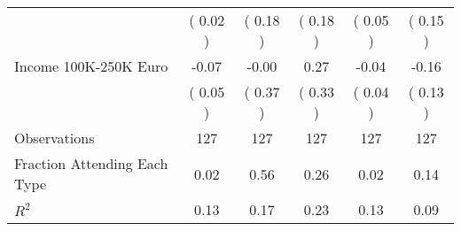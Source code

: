 \begin{table}[H]
{\begin{tabular}{lccccc}
\quad  & (     0.02 ) & (     0.18 )  & (     0.18 )  & (     0.05 ) & (     0.15 ) \\
\quad Income 100K-250K Euro &     -0.07 &     -0.00 &      0.27 &     -0.04 &     -0.16 \\
\quad  & (     0.05 ) & (     0.37 )  & (     0.33 )  & (     0.04 ) & (     0.13 ) \\
\midrule
Observations & 127 & 127 & 127 & 127 & 127 \\
Fraction Attending Each Type &      0.02 &      0.56 &      0.26 &      0.02 &      0.14 \\
\midrule
$ R^2$ &      0.13 &      0.17 &      0.23 &      0.13 &      0.09 \\
\bottomrule
\end{tabular}}
\end{table}
